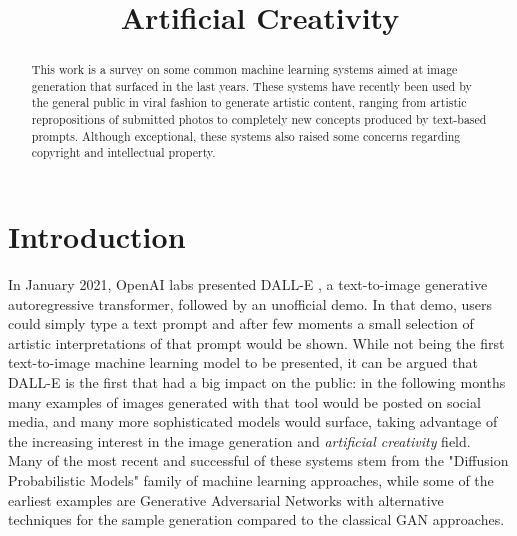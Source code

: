 \documentclass[conference]{IEEEtran}
\begin{document}
\title{Artificial Creativity}

\author{
}

\maketitle

\begin{abstract}
This work is a survey on some common machine learning systems aimed at image generation that surfaced in the last years. These systems have recently been used by the general public in viral fashion to generate artistic content, ranging from artistic repropositions of submitted photos to completely new concepts produced by text-based prompts. Although exceptional, these systems also raised some concerns regarding copyright and intellectual property.
\end{abstract}

\section{Introduction}
In January 2021, OpenAI labs presented DALL-E \cite{dallepaper}, a text-to-image generative autoregressive transformer, followed by an unofficial demo. In that demo, users could simply type a text prompt and after few moments a small selection of artistic interpretations of that prompt would be shown. While not being the first text-to-image machine learning model to be presented, it can be argued that DALL-E is the first that had a big impact on the public: in the following months many examples of images generated with that tool would be posted on social media, and many more sophisticated models would surface, taking advantage of the increasing interest in the image generation and \textit{artificial creativity} field.\\
Many of the most recent and successful of these systems stem from the "Diffusion Probabilistic Models" \cite{diffusionmodels} family of machine learning approaches, while some of the earliest examples are Generative Adversarial Networks \cite{GANs} with alternative techniques for the sample generation \cite{stylegan} compared to the classical GAN approaches.
\end{document}
